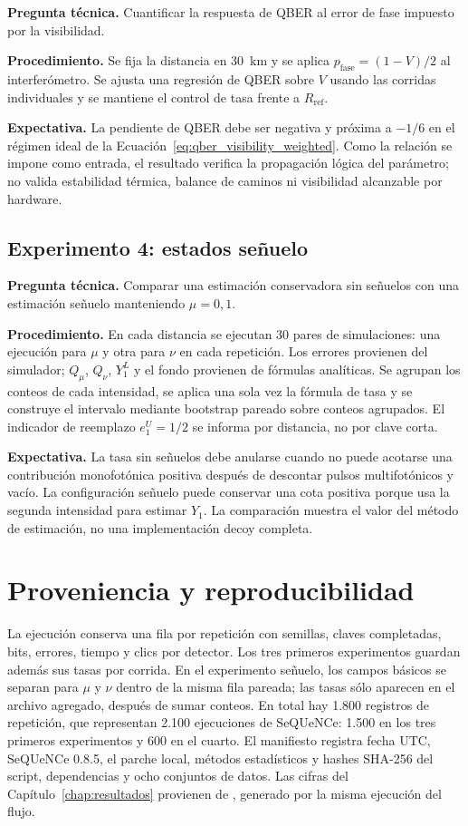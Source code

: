 \textbf{Pregunta técnica.} Cuantificar la respuesta de QBER al error de fase impuesto por la visibilidad.

\textbf{Procedimiento.} Se fija la distancia en \SI{30}{\kilo\meter} y se aplica \(p_\mathrm{fase}=(1-V)/2\) al interferómetro. Se ajusta una regresión de QBER sobre \(V\) usando las corridas individuales y se mantiene el control de tasa frente a \(R_\mathrm{ref}\).

\textbf{Expectativa.} La pendiente de QBER debe ser negativa y próxima a \(-1/6\) en el régimen ideal de la Ecuación~\ref{eq:qber_visibility_weighted}. Como la relación se impone como entrada, el resultado verifica la propagación lógica del parámetro; no valida estabilidad térmica, balance de caminos ni visibilidad alcanzable por hardware.

\subsection{Experimento 4: estados señuelo}

\textbf{Pregunta técnica.} Comparar una estimación conservadora sin señuelos con una estimación señuelo manteniendo \(\mu=0{,}1\).

\textbf{Procedimiento.} En cada distancia se ejecutan 30 pares de simulaciones: una ejecución para \(\mu\) y otra para \(\nu\) en cada repetición. Los errores provienen del simulador; \(Q_\mu\), \(Q_\nu\), \(Y_1^L\) y el fondo provienen de fórmulas analíticas. Se agrupan los conteos de cada intensidad, se aplica una sola vez la fórmula de tasa y se construye el intervalo mediante bootstrap pareado sobre conteos agrupados. El indicador de reemplazo \(e_1^U=1/2\) se informa por distancia, no por clave corta.

\textbf{Expectativa.} La tasa sin señuelos debe anularse cuando no puede acotarse una contribución monofotónica positiva después de descontar pulsos multifotónicos y vacío. La configuración señuelo puede conservar una cota positiva porque usa la segunda intensidad para estimar \(Y_1\). La comparación muestra el valor del método de estimación, no una implementación decoy completa.

\section{Proveniencia y reproducibilidad}

La ejecución conserva una fila por repetición con semillas, claves completadas, bits, errores, tiempo y clics por detector. Los tres primeros experimentos guardan además sus tasas por corrida. En el experimento señuelo, los campos básicos se separan para \(\mu\) y \(\nu\) dentro de la misma fila pareada; las tasas sólo aparecen en el archivo agregado, después de sumar conteos. En total hay 1.800 registros de repetición, que representan 2.100 ejecuciones de SeQUeNCe: 1.500 en los tres primeros experimentos y 600 en el cuarto. El manifiesto registra fecha UTC, SeQUeNCe 0.8.5, el parche local, métodos estadísticos y hashes SHA-256 del script, dependencias y ocho conjuntos de datos. Las cifras del Capítulo~\ref{chap:resultados} provienen de , generado por la misma ejecución del flujo.

